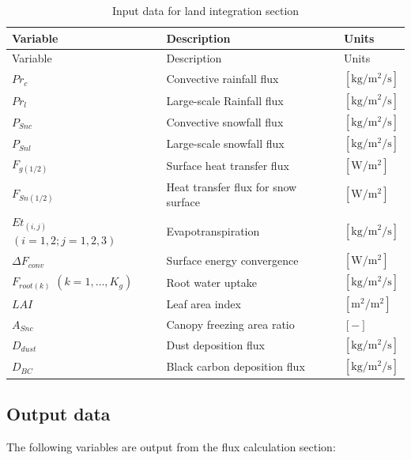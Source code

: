 \begin{longtable}[]{@{}lll@{}}
\caption{Input data for land integration section}\tabularnewline
\toprule
Variable & Description & Units \\
\midrule
\endfirsthead
\toprule
Variable & Description & Units \\
\midrule
\endhead
\(Pr_{c}\) & Convective rainfall flux & \(\mathrm{[kg/m^2/s]}\) \\
\(Pr_{l}\) & Large-scale Rainfall flux & \(\mathrm{[kg/m^2/s]}\) \\
\(P_{Snc}\) & Convective snowfall flux & \(\mathrm{[kg/m^2/s]}\) \\
\(P_{Snl}\) & Large-scale snowfall flux & \(\mathrm{[kg/m^2/s]}\) \\
\(F_{g(1/2)}\) & Surface heat transfer flux & \(\mathrm{[W/m^2]}\) \\
\(F_{Sn(1/2)}\) & Heat transfer flux for snow surface & \(\mathrm{[W/m^2]}\) \\
\(Et_{(i,j)}\) \((i=1,2;j=1,2,3)\) & Evapotranspiration & \(\mathrm{[kg/m^2/s]}\) \\
\(\Delta F_{conv}\) & Surface energy convergence & \(\mathrm{[W/m^2]}\) \\
\(F_{root(k)}\) \((k=1,\ldots,K_g)\) & Root water uptake & \(\mathrm{[kg/m^2/s]}\) \\
\(LAI\) & Leaf area index & \(\mathrm{[m^2/m^2]}\) \\
\(A_{Snc}\) & Canopy freezing area ratio & \(\mathrm{[-]}\) \\
\(D_{dust}\) & Dust deposition flux & \(\mathrm{[kg/m^2/s]}\) \\
\(D_{BC}\) & Black carbon deposition flux & \(\mathrm{[kg/m^2/s]}\) \\
\bottomrule
\end{longtable}

\hypertarget{output-data}{%
\subsection{Output data}\label{output-data}}

The following variables are output from the flux calculation section:

